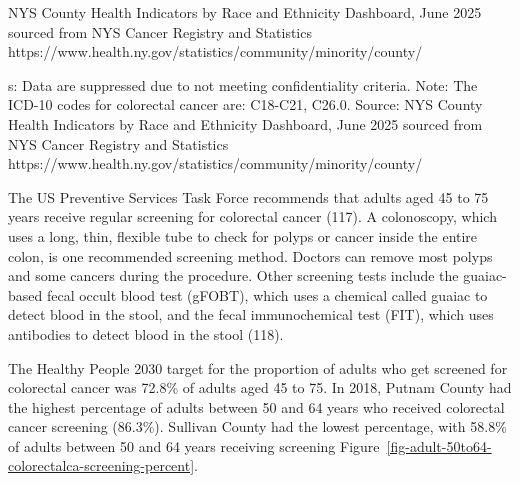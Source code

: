 \documentclass[
  english,
  letterpaper,
]{report}
\begin{document}
\begin{tcolorbox}[enhanced jigsaw, breakable, leftrule=.75mm, title=\textcolor{quarto-callout-note-color}{\faInfo}\hspace{0.5em}{Source}, bottomrule=.15mm, opacityback=0, left=2mm, colback=white, bottomtitle=1mm, coltitle=black, colbacktitle=quarto-callout-note-color!10!white, colframe=quarto-callout-note-color-frame, opacitybacktitle=0.6, toptitle=1mm, titlerule=0mm, arc=.35mm, rightrule=.15mm, toprule=.15mm]

NYS County Health Indicators by Race and Ethnicity Dashboard, June 2025
sourced from NYS Cancer Registry and Statistics
https://www.health.ny.gov/statistics/community/minority/county/

\end{tcolorbox}

\begin{tcolorbox}[enhanced jigsaw, breakable, leftrule=.75mm, title=\textcolor{quarto-callout-note-color}{\faInfo}\hspace{0.5em}{Note}, bottomrule=.15mm, opacityback=0, left=2mm, colback=white, bottomtitle=1mm, coltitle=black, colbacktitle=quarto-callout-note-color!10!white, colframe=quarto-callout-note-color-frame, opacitybacktitle=0.6, toptitle=1mm, titlerule=0mm, arc=.35mm, rightrule=.15mm, toprule=.15mm]

s: Data are suppressed due to not meeting confidentiality criteria.
Note: The ICD-10 codes for colorectal cancer are: C18-C21, C26.0.
Source: NYS County Health Indicators by Race and Ethnicity Dashboard,
June 2025 sourced from NYS Cancer Registry and Statistics
https://www.health.ny.gov/statistics/community/minority/county/

\end{tcolorbox}

The US Preventive Services Task Force recommends that adults aged 45 to
75 years receive regular screening for colorectal cancer (117). A
colonoscopy, which uses a long, thin, flexible tube to check for polyps
or cancer inside the entire colon, is one recommended screening method.
Doctors can remove most polyps and some cancers during the procedure.
Other screening tests include the guaiac-based fecal occult blood test
(gFOBT), which uses a chemical called guaiac to detect blood in the
stool, and the fecal immunochemical test (FIT), which uses antibodies to
detect blood in the stool (118).

The Healthy People 2030 target for the proportion of adults who get
screened for colorectal cancer was 72.8\% of adults aged 45 to 75. In
2018, Putnam County had the highest percentage of adults between 50 and
64 years who received colorectal cancer screening (86.3\%). Sullivan
County had the lowest percentage, with 58.8\% of adults between 50 and
64 years receiving screening
Figure~\ref{fig-adult-50to64-colorectalca-screening-percent}.
\end{document}
